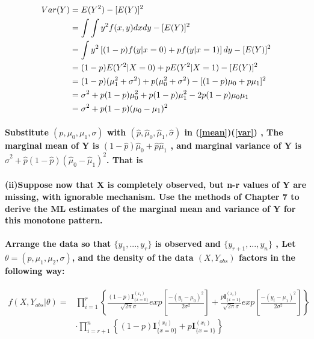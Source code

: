 \documentclass[a4paper]{article}
\newcommand{\yahei}{\CJKfamily{yahei}}
\begin{document}
\fontsize{9pt}{14pt}
\begin{align}
Var(Y) &= E(Y^2) - [E(Y)]^2 \notag\\
       &= \int \int y^2 f(x,y) dx dy - [E(Y)]^2 \notag\\
       &= \int y^2 \left[ (1-p)f(y|x=0) + pf(y|x=1) \right] dy - [E(Y)]^2 \notag\\
       &= (1-p)E(Y^2|X=0) + pE(Y^2|X=1) - [E(Y)]^2 \notag\\
       &= (1-p)(\mu_1^2+\sigma^2) + p(\mu_0^2+\sigma^2) - [(1-p)\mu_0 + p\mu_1]^2 \notag\\
       &= \sigma^2 + p(1-p)\mu_0^2 + p(1-p)\mu_1^2 - 2p(1-p)\mu_0\mu_1 \notag\\
       &= \sigma^2 + p(1-p)(\mu_0-\mu_1)^2
\label{var}
\end{align}

\paragraph{\fontsize{10pt}{14pt}\selectfont\yahei
Substitute $(p,\mu_0,\mu_1,\sigma)$ with $(\hat{p},\hat{\mu}_0,\hat{\mu}_1,\hat{\sigma})$ in (\ref{mean})(\ref{var}) , The marginal mean of Y is $(1-\hat{p})\hat{\mu}_0 + \hat{p}\hat{\mu}_1$ , and marginal variance of Y is $\hat{\sigma}^2 + \hat{p}(1-\hat{p})(\hat{\mu}_0-\hat{\mu}_1)^2$. That is
}

\paragraph{\fontsize{10pt}{14pt}\selectfont\yahei
(ii)Suppose now that X is completely observed, but n-r values of Y are missing, with ignorable mechanism. Use the methods of Chapter 7 to derive the ML estimates of the marginal mean and variance of Y for this monotone pattern.
}

\paragraph{\fontsize{10pt}{14pt}\selectfont\yahei
Arrange the data so that $\{y_1,...,y_r\}$ is observed and $\{y_{r+1},...,y_n\}$ , Let $\theta=(p,\mu_1,\mu_2,\sigma)$, and the density of the data $(X,Y_{obs})$ factors in the following way:
}

\fontsize{9pt}{14pt}
\begin{align*}
f(X,Y_{obs}|\theta)
=&\prod\limits_{i=1}^{r}
\left\lbrace
\frac{(1-p)\bm{I}_{\{x=0\}}^{(x_i)}}{\sqrt{2\pi}\sigma} exp\left[ \frac{ -(y_i-\mu_0)^2}{2\sigma^2} \right]
+
\frac{p\bm{I}_{\{x=1\}}^{(x_i)}}{\sqrt{2\pi}\sigma} exp\left[ \frac{ -(y_i-\mu_1)^2}{2\sigma^2} \right]
\right\rbrace
\\
&\cdot\prod\limits_{i=r+1}^{n}
\left\lbrace
(1-p)\bm{I}_{\{x=0\}}^{(x_i)} + p\bm{I}_{\{x=1\}}^{(x_i)}
\right\rbrace
\end{align*}
\end{document}
